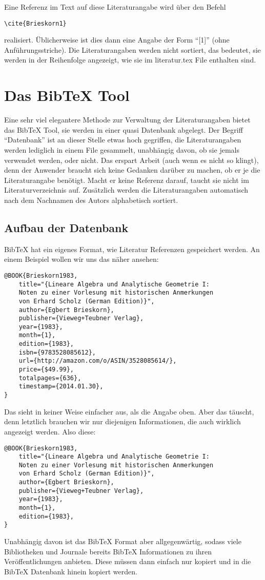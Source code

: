 Eine Referenz im Text auf diese Literaturangabe wird über den Befehl
\begin{verbatim}
\cite{Brieskorn1}
\end{verbatim}
realisiert. Üblicherweise ist dies dann eine Angabe der Form "`[1]"' (ohne Anführungsstriche). Die Literaturangaben werden nicht sortiert, das bedeutet, sie werden in der Reihenfolge angezeigt, wie sie im literatur.tex File enthalten sind. 

\section{Das BibTeX Tool}

Eine sehr viel elegantere Methode zur Verwaltung der Literaturangaben bietet das BibTeX Tool, sie werden in einer quasi Datenbank abgelegt. Der Begriff "`Datenbank"' ist an dieser Stelle etwas hoch gegriffen, die Literaturangaben werden lediglich in einem File gesammelt, unabhängig davon, ob sie jemals verwendet werden, oder nicht. Das erspart Arbeit (auch wenn es nicht so klingt), denn der Anwender braucht sich keine Gedanken darüber zu machen, ob er je die Literaturangabe benötigt. Macht er keine Referenz darauf, taucht sie nicht im Literaturverzeichnis auf. Zusätzlich werden die Literaturangaben automatisch nach dem Nachnamen des Autors alphabetisch sortiert. 

\subsection{Aufbau der Datenbank}

BibTeX hat ein eigenes Format, wie Literatur Referenzen gespeichert werden. An einem Beispiel wollen wir uns das näher ansehen: 
\begin{verbatim}
@BOOK{Brieskorn1983, 
	title="{Lineare Algebra und Analytische Geometrie I: 
	Noten zu einer Vorlesung mit historischen Anmerkungen 
	von Erhard Scholz (German Edition)}",
	author={Egbert Brieskorn},
	publisher={Vieweg+Teubner Verlag},
	year={1983},
	month={1},
	edition={1983},
	isbn={9783528085612},
	url={http://amazon.com/o/ASIN/3528085614/},
	price={$49.99},
	totalpages={636},
	timestamp={2014.01.30},
}
\end{verbatim}
Das sieht in keiner Weise einfacher aus, als die Angabe oben. Aber das täuscht, denn letztlich brauchen wir nur diejenigen Informationen, die auch wirklich angezeigt werden. Also diese:
\begin{verbatim}
@BOOK{Brieskorn1983, 
	title="{Lineare Algebra und Analytische Geometrie I: 
	Noten zu einer Vorlesung mit historischen Anmerkungen 
	von Erhard Scholz (German Edition)}",
	author={Egbert Brieskorn},
	publisher={Vieweg+Teubner Verlag},
	year={1983},
	month={1},
	edition={1983},
}
\end{verbatim}
Unabhängig davon ist das BibTeX Format aber allgegenwärtig, sodass viele Bibliotheken und Journale bereits BibTeX Informationen zu ihren Veröffentlichungen anbieten. Diese müssen dann einfach nur kopiert und in die BibTeX Datenbank hinein kopiert werden. 

